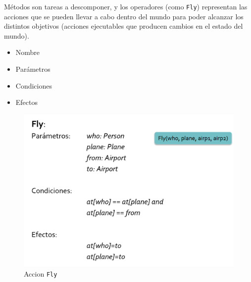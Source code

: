 \begin{paracol}{2}
   Métodos son tareas a descomponer, y los operadores (como \lstinline|Fly|) representan las acciones que se pueden llevar a cabo dentro del
   mundo para poder alcanzar los distintos objetivos (acciones
   ejecutables que producen cambios en el estado del mundo).
   \begin{itemize}
      \item Nombre
      \item Parámetros
      \item Condiciones
      \item Efectos
   \end{itemize}
   
   \switchcolumn

   \begin{figure}[htbp]
      \centering
      \includegraphics{images/02/accionFly.png}
      \caption{Accion \lstinline|Fly|}
      \label{fig:02/accionFly}
   \end{figure}
\end{paracol}